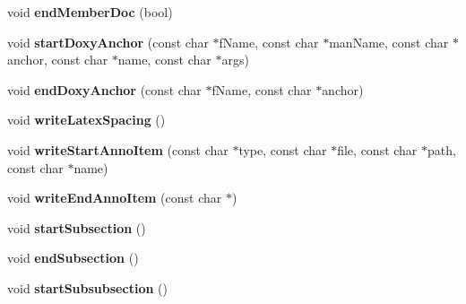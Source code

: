 \begin{DoxyCompactItemize}
\item 
\hypertarget{class_html_generator_ab4c60a384c219329e0dfd963e34336eb}{void {\bfseries end\-Member\-Doc} (bool)}\label{class_html_generator_ab4c60a384c219329e0dfd963e34336eb}

\item 
\hypertarget{class_html_generator_ae53ee4f22f957f141bdf9df8b626d61c}{void {\bfseries start\-Doxy\-Anchor} (const char $\ast$f\-Name, const char $\ast$man\-Name, const char $\ast$anchor, const char $\ast$name, const char $\ast$args)}\label{class_html_generator_ae53ee4f22f957f141bdf9df8b626d61c}

\item 
\hypertarget{class_html_generator_ab086b8f05ad2ba785b25d770ad285301}{void {\bfseries end\-Doxy\-Anchor} (const char $\ast$f\-Name, const char $\ast$anchor)}\label{class_html_generator_ab086b8f05ad2ba785b25d770ad285301}

\item 
\hypertarget{class_html_generator_a0024111efcef4c86c58a90626442526b}{void {\bfseries write\-Latex\-Spacing} ()}\label{class_html_generator_a0024111efcef4c86c58a90626442526b}

\item 
\hypertarget{class_html_generator_a33695af2d50fc8c46a5ba1eb806e7ab5}{void {\bfseries write\-Start\-Anno\-Item} (const char $\ast$type, const char $\ast$file, const char $\ast$path, const char $\ast$name)}\label{class_html_generator_a33695af2d50fc8c46a5ba1eb806e7ab5}

\item 
\hypertarget{class_html_generator_a8d74d69722dad80dc302ed06c14dfa87}{void {\bfseries write\-End\-Anno\-Item} (const char $\ast$)}\label{class_html_generator_a8d74d69722dad80dc302ed06c14dfa87}

\item 
\hypertarget{class_html_generator_a0e68709c755fc3aef30de8ee8ccb3080}{void {\bfseries start\-Subsection} ()}\label{class_html_generator_a0e68709c755fc3aef30de8ee8ccb3080}

\item 
\hypertarget{class_html_generator_a3fb66f3466cdfc1a0a77b8b6282dc0e8}{void {\bfseries end\-Subsection} ()}\label{class_html_generator_a3fb66f3466cdfc1a0a77b8b6282dc0e8}

\item 
\hypertarget{class_html_generator_a990a0621ea42a9028bb4162b40be4f61}{void {\bfseries start\-Subsubsection} ()}\label{class_html_generator_a990a0621ea42a9028bb4162b40be4f61}


\end{DoxyCompactItemize}
